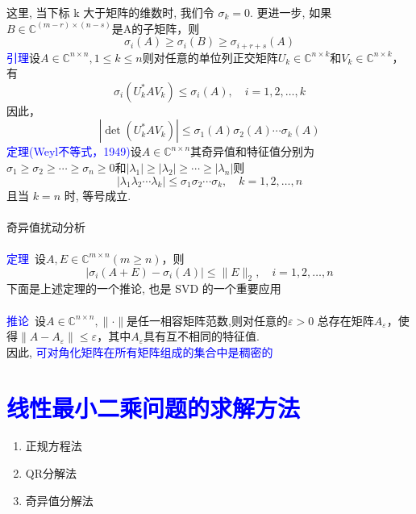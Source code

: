 \documentclass[12pt,a4paper]{article}
\begin{document}
这里, 当下标 k 大于矩阵的维数时, 我们令 $\sigma_{k} = 0$.
更进一步, 如果$B \in \mathbb{C}^{(m-r) \times(n-s)}$是A的子矩阵，则
$$
\sigma_{i}(A) \geq \sigma_{i}(B) \geq \sigma_{i+r+s}(A)
$$
\textcolor{blue}{引理}设$A \in \mathbb{C}^{n \times n}, 1 \leq k \leq n$则对任意的单位列正交矩阵$U_{k} \in \mathbb{C}^{n \times k}$和$V_{k} \in \mathbb{C}^{n \times k}$，有
\begin{equation}
\sigma_{i}\left(U_{k}^{*} A V_{k}\right) \leq \sigma_{i}(A), \quad i=1,2, \ldots, k
\end{equation}
因此，
\begin{equation}
\left|\operatorname{det}\left(U_{k}^{*} A V_{k}\right)\right| \leq \sigma_{1}(A) \sigma_{2}(A) \cdots \sigma_{k}(A)
\end{equation}
\textcolor{blue}{定理(Weyl不等式，1949)}设$A \in \mathbb{C}^{n \times n}$其奇异值和特征值分别为$\sigma_{1} \geq \sigma_{2} \geq \cdots \geq \sigma_{n} \geq 0$和$\left|\lambda_{1}\right| \geq\left|\lambda_{2}\right| \geq \cdots \geq\left|\lambda_{n}\right|$则
$$
\left|\lambda_{1} \lambda_{2} \cdots \lambda_{k}\right| \leq \sigma_{1} \sigma_{2} \cdots \sigma_{k}, \quad k=1,2, \ldots, n
$$
且当 $k = n$ 时, 等号成立.\\
\\
奇异值扰动分析\\
\\
\textcolor{blue}{定理}~设$A, E \in \mathbb{C}^{m \times n}(m \geq n)$，则
$$
\left|\sigma_{i}(A+E)-\sigma_{i}(A)\right| \leq\|E\|_{2}, \quad i=1,2, \ldots, n
$$
下面是上述定理的一个推论, 也是 SVD 的一个重要应用\\
\\
\textcolor{blue}{推论}~设$A \in \mathbb{C}^{n \times n},\|\cdot\|$是任一相容矩阵范数,则对任意的$\varepsilon>0$
总存在矩阵$A_{\varepsilon}$，使得$\left\|A-A_{\varepsilon}\right\| \leq \varepsilon$，其中$A_{\varepsilon}$具有互不相同的特征值.\\
 因此, \textcolor{blue}{可对角化矩阵在所有矩阵组成的集合中是稠密的}
\section{\textcolor{blue}{线性最小二乘问题的求解方法}}
\begin{enumerate}[5.1]
\item 正规方程法
\item QR分解法
\item 奇异值分解法
\end{enumerate}
\end{document}
